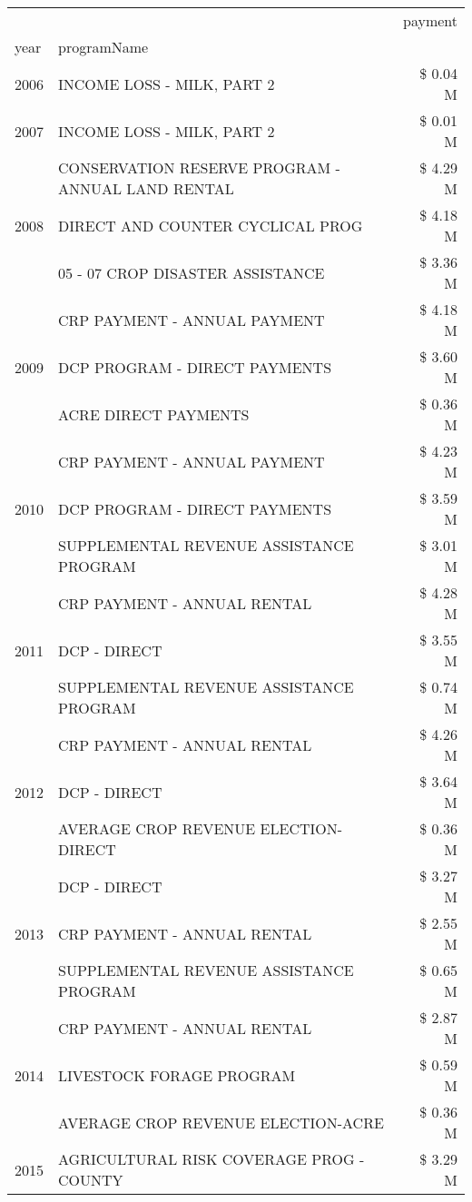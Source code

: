 \begin{tabular}{llr}
\toprule
 &  & payment \\
year & programName &  \\
\midrule
2006 & INCOME LOSS - MILK, PART 2 & \$ 0.04 M \\
\cline{1-3}
2007 & INCOME LOSS - MILK, PART 2 & \$ 0.01 M \\
\cline{1-3}
\multirow[t]{3}{*}{2008} & CONSERVATION RESERVE PROGRAM - ANNUAL LAND RENTAL & \$ 4.29 M \\
 & DIRECT AND COUNTER CYCLICAL PROG & \$ 4.18 M \\
 & 05 - 07 CROP DISASTER ASSISTANCE & \$ 3.36 M \\
\cline{1-3}
\multirow[t]{3}{*}{2009} & CRP PAYMENT - ANNUAL PAYMENT & \$ 4.18 M \\
 & DCP PROGRAM - DIRECT PAYMENTS & \$ 3.60 M \\
 & ACRE DIRECT PAYMENTS & \$ 0.36 M \\
\cline{1-3}
\multirow[t]{3}{*}{2010} & CRP PAYMENT - ANNUAL PAYMENT & \$ 4.23 M \\
 & DCP PROGRAM - DIRECT PAYMENTS & \$ 3.59 M \\
 & SUPPLEMENTAL REVENUE ASSISTANCE PROGRAM & \$ 3.01 M \\
\cline{1-3}
\multirow[t]{3}{*}{2011} & CRP PAYMENT - ANNUAL RENTAL & \$ 4.28 M \\
 & DCP - DIRECT & \$ 3.55 M \\
 & SUPPLEMENTAL REVENUE ASSISTANCE PROGRAM & \$ 0.74 M \\
\cline{1-3}
\multirow[t]{3}{*}{2012} & CRP PAYMENT - ANNUAL RENTAL & \$ 4.26 M \\
 & DCP - DIRECT & \$ 3.64 M \\
 & AVERAGE CROP REVENUE ELECTION-DIRECT & \$ 0.36 M \\
\cline{1-3}
\multirow[t]{3}{*}{2013} & DCP - DIRECT & \$ 3.27 M \\
 & CRP PAYMENT - ANNUAL RENTAL & \$ 2.55 M \\
 & SUPPLEMENTAL REVENUE ASSISTANCE PROGRAM & \$ 0.65 M \\
\cline{1-3}
\multirow[t]{3}{*}{2014} & CRP PAYMENT - ANNUAL RENTAL & \$ 2.87 M \\
 & LIVESTOCK FORAGE PROGRAM & \$ 0.59 M \\
 & AVERAGE CROP REVENUE ELECTION-ACRE & \$ 0.36 M \\
\cline{1-3}
\multirow[t]{3}{*}{2015} & AGRICULTURAL RISK COVERAGE PROG - COUNTY & \$ 3.29 M \\

\end{tabular}

